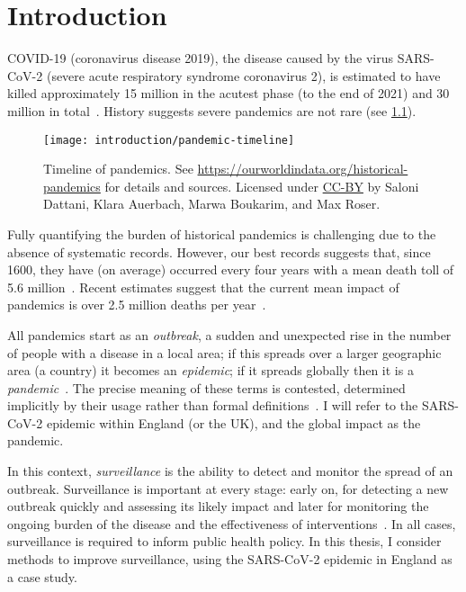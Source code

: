 \documentclass[thesis.tex]{subfiles}
\begin{document}
\chapter{Introduction} \label{intro}

COVID-19 (coronavirus disease 2019), the disease caused by the virus SARS-CoV-2 (severe acute respiratory syndrome coronavirus 2), is estimated to have killed approximately 15 million in the acutest phase (to the end of 2021) and 30 million in total~\autocite{whoCOVIDExcess,economistCOVIDExcess}.
History suggests severe pandemics are not rare (see \cref{intro:fig:pandemic-timeline}).
\begin{figure}
    \texttt{[image: introduction/pandemic-timeline]}
    \caption[Timeline of pandemics.]{%
        Timeline of pandemics.
        See \url{https://ourworldindata.org/historical-pandemics} for details and sources.
        Licensed under \href{https://creativecommons.org/licenses/by/4.0/}{CC-BY} by Saloni Dattani, Klara Auerbach, Marwa Boukarim, and Max Roser.
    }
    \label{intro:fig:pandemic-timeline}
\end{figure}
Fully quantifying the burden of historical pandemics is challenging due to the absence of systematic records.
However, our best records suggests that, since 1600, they have (on average) occurred every four years with a mean death toll of 5.6 million~\autocite{maraniNovelEpidemics}.
Recent estimates suggest that the current mean impact of pandemics is over 2.5 million deaths per year~\autocite{madhavPandemicMortality}.

All pandemics start as an \emph{outbreak}, a sudden and unexpected rise in the number of people with a disease in a local area; if this spreads over a larger geographic area (\eg a country) it becomes an \emph{epidemic}; if it spreads globally then it is a \emph{pandemic}~\autocite{grennanPandemic}.
The precise meaning of these terms is contested, determined implicitly by their usage rather than formal definitions~\autocite{morensPandemic,doshiElusive}.
I will refer to the SARS-CoV-2 epidemic within England (or the UK), and the global impact as the pandemic.

In this context, \emph{surveillance} is the ability to detect and monitor the spread of an outbreak.
Surveillance is important at every stage: early on, for detecting a new outbreak quickly and assessing its likely impact and later for monitoring the ongoing burden of the disease and the effectiveness of interventions~\autocite{whoFluSurveillance}.
In all cases, surveillance is required to inform public health policy.
In this thesis, I consider methods to improve surveillance, using the SARS-CoV-2 epidemic in England as a case study.
\end{document}
